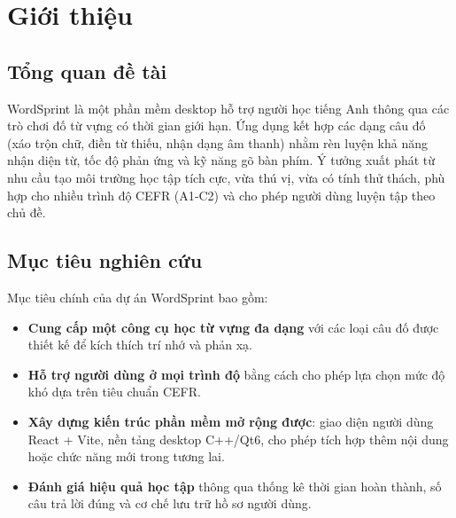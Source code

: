 
\chapter{Giới thiệu}
\label{chap:introduction}

\section{Tổng quan đề tài}
\label{sec:overview}
WordSprint là một phần mềm desktop hỗ trợ người học tiếng Anh thông qua các trò chơi đố từ vựng có thời gian giới hạn. Ứng dụng kết hợp các dạng câu đố (xáo trộn chữ, điền từ thiếu, nhận dạng âm thanh) nhằm rèn luyện khả năng nhận diện từ, tốc độ phản ứng và kỹ năng gõ bàn phím. Ý tưởng xuất phát từ nhu cầu tạo môi trường học tập tích cực, vừa thú vị, vừa có tính thử thách, phù hợp cho nhiều trình độ CEFR (A1‑C2) và cho phép người dùng luyện tập theo chủ đề.

\section{Mục tiêu nghiên cứu}
\label{sec:objectives}
Mục tiêu chính của dự án WordSprint bao gồm:
\begin{itemize}
    \item \textbf{Cung cấp một công cụ học từ vựng đa dạng} với các loại câu đố được thiết kế để kích thích trí nhớ và phản xạ.
    \item \textbf{Hỗ trợ người dùng ở mọi trình độ} bằng cách cho phép lựa chọn mức độ khó dựa trên tiêu chuẩn CEFR.
    \item \textbf{Xây dựng kiến trúc phần mềm mở rộng được}: giao diện người dùng React + Vite, nền tảng desktop C++/Qt6, cho phép tích hợp thêm nội dung hoặc chức năng mới trong tương lai.
    \item \textbf{Đánh giá hiệu quả học tập} thông qua thống kê thời gian hoàn thành, số câu trả lời đúng và cơ chế lưu trữ hồ sơ người dùng.
\end{itemize}

